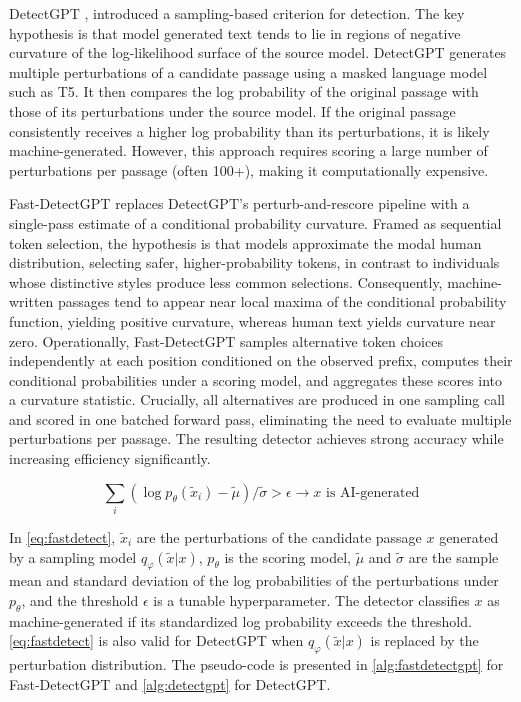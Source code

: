 \documentclass[11pt]{article}
\begin{document}
DetectGPT \cite{detectgpt}, introduced a sampling-based criterion for detection. The key hypothesis is that model generated text tends to lie in regions of negative curvature of the log-likelihood surface of the source model. DetectGPT generates multiple perturbations of a candidate passage using a masked language model such as T5. It then compares the log probability of the original passage with those of its perturbations under the source model. If the original passage consistently receives a higher log probability than its perturbations, it is likely machine-generated. However, this approach requires scoring a large number of perturbations per passage (often 100+), making it computationally expensive.

Fast-DetectGPT replaces DetectGPT’s perturb-and-rescore pipeline with a single-pass estimate of a conditional probability curvature. Framed as sequential token selection, the hypothesis is that models approximate the modal human distribution, selecting safer, higher-probability tokens, in contrast to individuals whose distinctive styles produce less common selections. Consequently, machine-written passages tend to appear near local maxima of the conditional probability function, yielding positive curvature, whereas human text yields curvature near zero. Operationally, Fast-DetectGPT samples alternative token choices independently at each position conditioned on the observed prefix, computes their conditional probabilities under a scoring model, and aggregates these scores into a curvature statistic. Crucially, all alternatives are produced in one sampling call and scored in one batched forward pass, eliminating the need to evaluate multiple perturbations per passage. The resulting detector achieves strong accuracy while increasing efficiency significantly.

\begin{equation}
  \sum_{i} (\log p_\theta (\tilde{x}_i)-\tilde{\mu})/\tilde{\sigma} > \epsilon \rightarrow x \text{ is AI-generated} \label{eq:fastdetect}
\end{equation}

In \cref{eq:fastdetect}, $\tilde{x}_i$ are the perturbations of the candidate passage $x$ generated by a sampling model $q_\varphi(\tilde{x}|x)$, $p_\theta$ is the scoring model, $\tilde{\mu}$ and $\tilde{\sigma}$ are the sample mean and standard deviation of the log probabilities of the perturbations under $p_\theta$, and the threshold $\epsilon$ is a tunable hyperparameter. The detector classifies $x$ as machine-generated if its standardized log probability exceeds the threshold. \cref{eq:fastdetect} is also valid for DetectGPT when $q_\varphi(\tilde{x}|x)$ is replaced by the perturbation distribution.
The pseudo-code is presented in \cref{alg:fastdetectgpt} for Fast-DetectGPT and \cref{alg:detectgpt} for DetectGPT.
\end{document}
